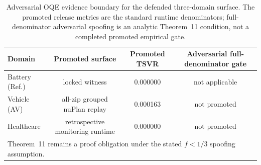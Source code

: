 \begin{table}[htbp]
\centering\small
\caption{Adversarial OQE evidence boundary for the defended three-domain surface. The promoted release metrics are the standard runtime denominators; full-denominator adversarial spoofing is an analytic Theorem~11 condition, not a completed promoted empirical gate.}
\label{tab:adversarial_tsvr}
\begin{tabular}{lccc}
\toprule
\textbf{Domain} & \textbf{Promoted surface} & \textbf{Promoted TSVR} & \textbf{Adversarial full-denominator gate} \\
\midrule
Battery (Ref.) & locked witness & 0.000000 & not applicable \\
Vehicle (AV) & all-zip grouped nuPlan replay & 0.000163 & not promoted \\
Healthcare & retrospective monitoring runtime & 0.000000 & not promoted \\
\bottomrule
\multicolumn{4}{l}{\small Theorem~11 remains a proof obligation under the stated $f<1/3$ spoofing assumption.}\\
\end{tabular}
\end{table}
